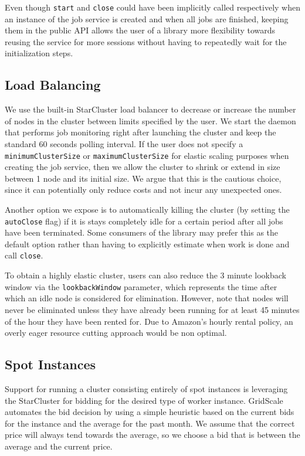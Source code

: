 Even though \verb|start| and \verb|close| could have been implicitly called respectively when an instance of the job service is created and when all jobs are finished, keeping them in the public API allows the user of a library more flexibility towards reusing the service for more sessions without having to repeatedly wait for the initialization steps.

\subsection{Load Balancing}

We use the built-in StarCluster load balancer to decrease or increase the number of nodes in the cluster between limits specified by the user. We start the daemon that performs job monitoring right after launching the cluster and keep the standard 60 seconds polling interval. If the user does not specify a \verb|minimumClusterSize| or \verb|maximumClusterSize| for elastic scaling purposes when creating the job service, then we allow the cluster to shrink or extend in size between 1 node and its initial size. We argue that this is the cautious choice, since it can potentially only reduce costs and not incur any unexpected ones.

Another option we expose is to automatically killing the cluster (by setting the \verb|autoClose| flag) if it is stays completely idle for a certain period after all jobs have been terminated. Some consumers of the library may prefer this as the default option rather than having to explicitly estimate when work is done and call \verb|close|.

To obtain a highly elastic cluster, users can also reduce the 3 minute lookback window via the \verb|lookbackWindow| parameter, which represents the time after which an idle node is considered for elimination. However, note that nodes will never be eliminated unless they have already been running for at least 45 minutes of the hour they have been rented for. Due to Amazon's hourly rental policy, an overly eager resource cutting approach would be non optimal.

\subsection{Spot Instances}

Support for running a cluster consisting entirely of spot instances is leveraging the StarCluster for bidding for the desired type of worker instance. GridScale automates the bid decision by using a simple heuristic based on the current bids for the instance and the average for the past month. We assume that the correct price will always tend towards the average, so we choose a bid that is between the average and the current price. 

